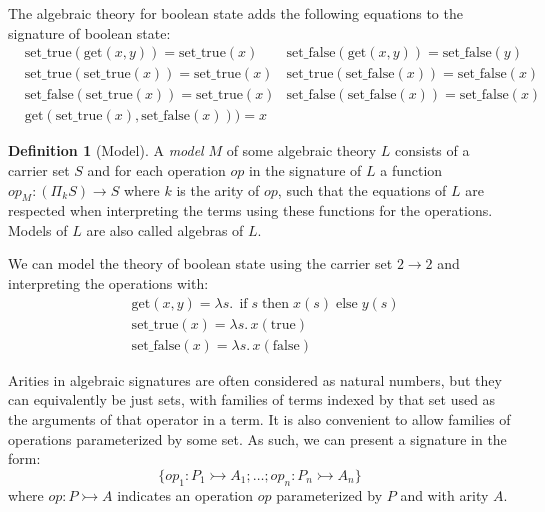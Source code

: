 \documentclass[acmsmall, screen, review, anonymous]{acmart}
\theoremstyle{definition}
\newtheorem{definition}{Definition}[section]
\newcommand{\types}{\mathrel{:}}
\newcommand{\mif}{\mathop{\mathrm{if}}}
\newcommand{\mthen}{\mathop{\mathrm{then}}}
\newcommand{\melse}{\mathop{\mathrm{else}}}
\begin{document}
\begin{example}
  The algebraic theory for boolean state adds the following equations to
  the signature of boolean state:
  \begin{align*}
    &\mathrm{set\_true}(\mathrm{get}(x, y)) = \mathrm{set\_true}(x)
    &\mathrm{set\_false}(\mathrm{get}(x, y)) = \mathrm{set\_false}(y) \\
    &\mathrm{set\_true}(\mathrm{set\_true}(x)) = \mathrm{set\_true}(x)
    &\mathrm{set\_true}(\mathrm{set\_false}(x)) = \mathrm{set\_false}(x) \\
    &\mathrm{set\_false}(\mathrm{set\_true}(x)) = \mathrm{set\_true}(x)
    &\mathrm{set\_false}(\mathrm{set\_false}(x)) = \mathrm{set\_false}(x) \\
    &\mathrm{get}(\mathrm{set\_true}(x), \mathrm{set\_false}(x))) = x
  \end{align*}
\end{example}

\begin{definition}[Model]
  A \emph{model} $M$ of some algebraic theory $L$ consists of a carrier
  set $S$ and for each operation $op$ in the signature of $L$ a function
  $op_M : (\Pi_k S) \rightarrow S$ where $k$ is the arity of $op$, such
  that the equations of $L$ are respected when interpreting the terms
  using these functions for the operations. Models of $L$ are also
  called algebras of $L$.
\end{definition}

\begin{example}
  We can model the theory of boolean state using the carrier set
  $2 \rightarrow 2$ and interpreting the operations with:
  \begin{align*}
    &\mathrm{get}(x, y) = \lambda s.\, \mif s \mthen x(s) \melse y(s) \\
    &\mathrm{set\_true}(x) = \lambda s.\, x(\mathrm{true}) \\
    &\mathrm{set\_false}(x) = \lambda s.\, x(\mathrm{false})
  \end{align*}
\end{example}

Arities in algebraic signatures are often considered as natural numbers,
but they can equivalently be just sets, with families of terms indexed
by that set used as the arguments of that operator in a term. It is also
convenient to allow families of operations parameterized by some set. As
such, we can present a signature in the form:
\begin{equation*}
\{ op_1 \types P_1 \rightarrowtail A_1; \ldots; op_n
\types P_n \rightarrowtail A_n \}
\end{equation*}
where $op \types P \rightarrowtail A$ indicates an operation $op$
parameterized by $P$ and with arity $A$.
\end{document}
